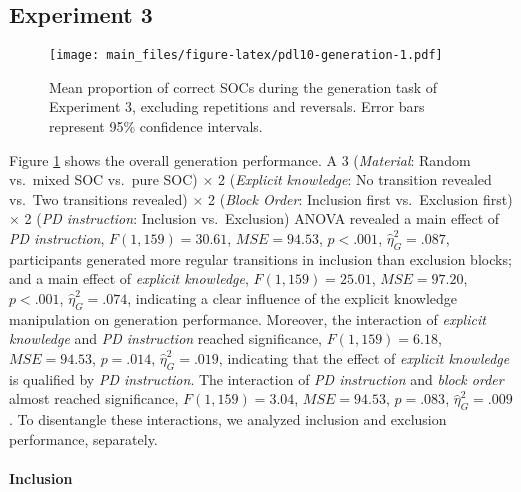 \documentclass[floatsintext,doc]{apa6}
\theoremstyle{definition}
\theoremstyle{definition}
\theoremstyle{definition}
\theoremstyle{remark}
\begin{document}
\begin{appendix}
\subsection{Experiment 3}\label{experiment-3}

\begin{figure}
\centering
\texttt{[image: main\_files/figure-latex/pdl10-generation-1.pdf]}
\caption{\label{fig:pdl10-generation}Mean proportion of correct SOCs during
the generation task of Experiment 3, excluding repetitions and
reversals. Error bars represent 95\% confidence intervals.}
\end{figure}

Figure \ref{fig:pdl10-generation} shows the overall generation
performance. A 3 (\emph{Material}: Random vs.~mixed SOC vs.~pure SOC)
\(\times\) 2 (\emph{Explicit knowledge}: No transition revealed vs.~Two
transitions revealed) \(\times\) 2 (\emph{Block Order}: Inclusion first
vs.~Exclusion first) \(\times\) 2 (\emph{PD instruction}: Inclusion
vs.~Exclusion) ANOVA revealed a main effect of \emph{PD instruction},
\(F(1, 159) = 30.61\), \(\mathit{MSE} = 94.53\), \(p < .001\),
\(\hat{\eta}^2_G = .087\), participants generated more regular
transitions in inclusion than exclusion blocks; and a main effect of
\emph{explicit knowledge}, \(F(1, 159) = 25.01\),
\(\mathit{MSE} = 97.20\), \(p < .001\), \(\hat{\eta}^2_G = .074\),
indicating a clear influence of the explicit knowledge manipulation on
generation performance. Moreover, the interaction of \emph{explicit
knowledge} and \emph{PD instruction} reached significance,
\(F(1, 159) = 6.18\), \(\mathit{MSE} = 94.53\), \(p = .014\),
\(\hat{\eta}^2_G = .019\), indicating that the effect of \emph{explicit
knowledge} is qualified by \emph{PD instruction}. The interaction of
\emph{PD instruction} and \emph{block order} almost reached
significance, \(F(1, 159) = 3.04\), \(\mathit{MSE} = 94.53\),
\(p = .083\), \(\hat{\eta}^2_G = .009\). To disentangle these
interactions, we analyzed inclusion and exclusion performance,
separately.

\paragraph{Inclusion}\label{inclusion-1}


\end{appendix}
\end{document}
